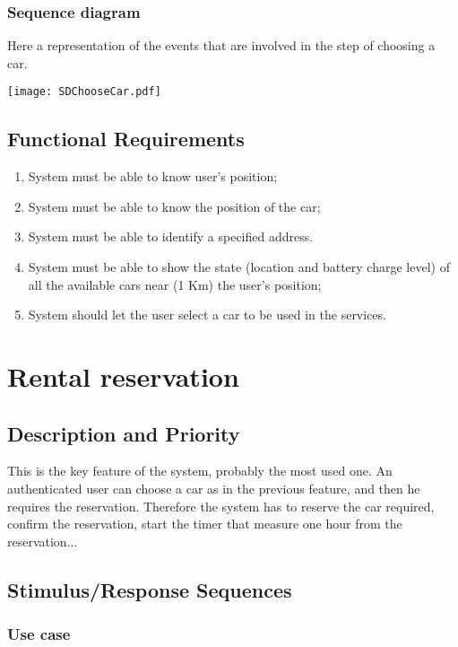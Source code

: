 \documentclass{scrreprt}
\begin{document}
\subsubsection{Sequence diagram}
Here a representation of the events that are involved in the step of choosing a car.
\begin{center}
\texttt{[image: SDChooseCar.pdf]}
\end{center}

\subsection{Functional Requirements}
\begin{enumerate}[label=R\arabic*.,resume]
\item System must be able to know user's position;%
\item System must be able to know the position of the car;%
\item System must be able to identify a specified address.%
\item System must be able to show the state (location and battery charge level) of all the available cars near (1 Km) the user's position;
\item System should let the user select a car to be used in the services.
\end{enumerate}

\section{Rental reservation}
\subsection{Description and Priority}
This is the key feature of the system, probably the most used one. An authenticated user can choose a car as in the previous feature, and then he requires the reservation. Therefore the system has to reserve the car required, confirm the reservation, start the timer that measure one hour from the reservation...
\subsection{Stimulus/Response Sequences}
\subsubsection{Use case}
\end{document}
